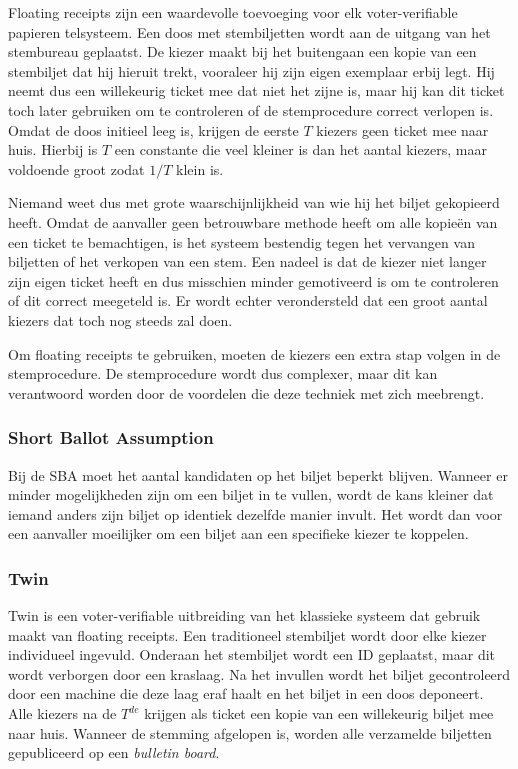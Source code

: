Floating receipts zijn een waardevolle toevoeging voor elk voter-verifiable papieren telsysteem. Een doos met stembiljetten wordt aan de uitgang van het stembureau geplaatst. De kiezer maakt bij het buitengaan een kopie van een stembiljet dat hij hieruit trekt, vooraleer hij zijn eigen exemplaar erbij legt. Hij neemt dus een willekeurig ticket mee dat niet het zijne is, maar hij kan dit ticket toch later gebruiken om te controleren of de stemprocedure correct verlopen is. Omdat de doos initieel leeg is, krijgen de eerste $T$ kiezers geen ticket mee naar huis. Hierbij is $T$ een constante die veel kleiner is dan het aantal kiezers, maar voldoende groot zodat $1/T$ klein is.

\npar Niemand weet dus met grote waarschijnlijkheid van wie hij het biljet gekopieerd heeft. Omdat de aanvaller geen betrouwbare methode heeft om alle kopie\"en van een ticket te bemachtigen, is het systeem bestendig tegen het vervangen van biljetten of het verkopen van een stem. Een nadeel is dat de kiezer niet langer zijn eigen ticket heeft en dus misschien minder gemotiveerd is om te controleren of dit correct meegeteld is. Er wordt echter verondersteld dat een groot aantal kiezers dat toch nog steeds zal doen.

\npar Om floating receipts te gebruiken, moeten de kiezers een extra stap volgen in de stemprocedure. De stemprocedure wordt dus complexer, maar dit kan verantwoord worden door de voordelen die deze techniek met zich meebrengt.

\subsubsection{Short Ballot Assumption}
\label{sec:ls:short_ballot_assumption}

Bij de SBA moet het aantal kandidaten op het biljet beperkt blijven. Wanneer er minder mogelijkheden zijn om een biljet in te vullen, wordt de kans kleiner dat iemand anders zijn biljet op identiek dezelfde manier invult. Het wordt dan voor een aanvaller moeilijker om een biljet aan een specifieke kiezer te koppelen.\cite{cichon_kutylowski_weglorz_short_ballot_assumption}

\subsubsection{Twin~\cite{rivest_smith_three_voting_protocols}}
\label{sec:ls:twin}

Twin is een voter-verifiable uitbreiding van het klassieke systeem dat gebruik maakt van floating receipts. Een traditioneel stembiljet wordt door elke kiezer individueel ingevuld. Onderaan het stembiljet wordt een ID geplaatst, maar dit wordt verborgen door een kraslaag. Na het invullen wordt het biljet gecontroleerd door een machine die deze laag eraf haalt en het biljet in een doos deponeert. Alle kiezers na de $T^{de}$ krijgen als ticket een kopie van een willekeurig biljet mee naar huis. Wanneer de stemming afgelopen is, worden alle verzamelde biljetten gepubliceerd op een \textit{bulletin board}.

